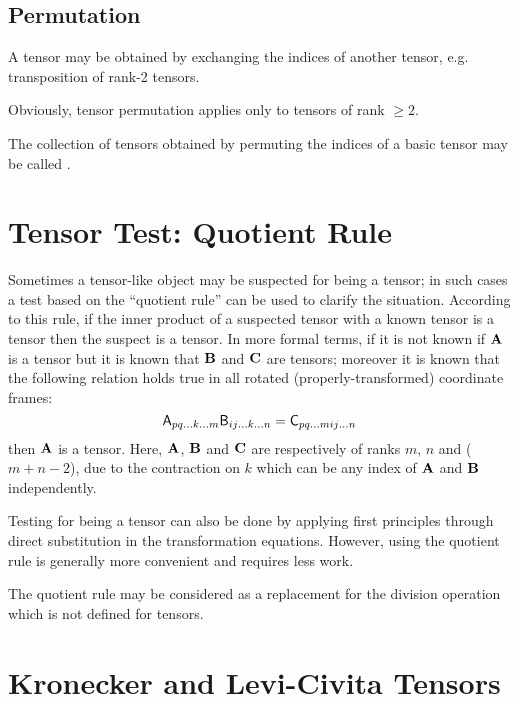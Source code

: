 \subsection{Permutation}

 A tensor may be obtained by exchanging the indices of another
tensor, e.g. transposition of rank-2 tensors.

 Obviously, tensor permutation applies only to tensors of rank $\ge2$.

 The collection of tensors obtained by permuting the indices
of a basic tensor may be called .


\section{Tensor Test: Quotient Rule}

 Sometimes a tensor-like object may be suspected for being
a tensor; in such cases a test based on the ``quotient rule'' can
be used to clarify the situation. According to this rule, if the inner
product of a suspected tensor with a known tensor is a tensor then
the suspect is a tensor. In more formal terms, if it is not known
if $\mathbf{ A}$ is a tensor but it is known that $\mathbf{ B}$ and
$\mathbf{ C}$ are tensors; moreover it is known that the following
relation holds true in all rotated (properly-transformed) coordinate
frames:
\begin{equation}
\mathsf{A}_{pq\ldots k\ldots m}\mathsf{B}_{ij\ldots k\ldots n}=\mathsf{C}_{pq\ldots mij\ldots n}\label{eqQuotientRule}
\end{equation}
then $\mathbf{ A}$ is a tensor. Here, $\mathbf{ A}$, $\mathbf{ B}$
and $\mathbf{ C}$ are respectively of ranks $m,\,n$ and ($m+n-2$),
due to the contraction on $k$ which can be any index of $\mathbf{ A}$
and $\mathbf{ B}$ independently.

 Testing for being a tensor can also be done by applying
first principles through direct substitution in the transformation
equations. However, using the quotient rule is generally more convenient
and requires less work.

 The quotient rule may be considered as a replacement for
the division operation which is not defined for tensors.




\section{Kronecker and Levi-Civita Tensors}

